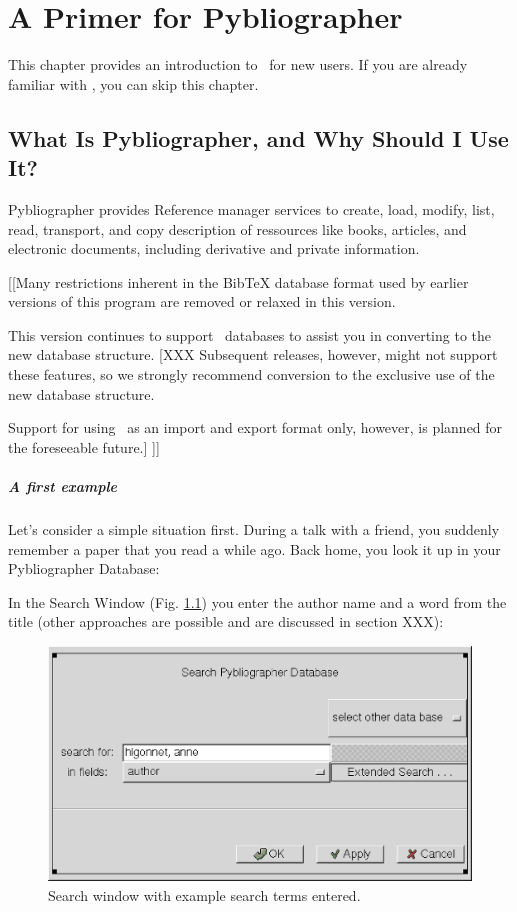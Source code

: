 
\chapter[Introduction]{A Primer for Pybliographer}
\label{cha:rgintro}


This chapter provides an introduction to \Pyb\ for new users.
If you are already familiar with \Pyb, you can skip this chapter.


\section{What Is Pybliographer, and Why Should I Use It? }
\label{sec:whyuse}




Pybliographer provides Reference manager services to create, load,
modify, list, read, transport, and copy description of ressources like
books, articles, and electronic documents, including derivative and
private information.

[[Many restrictions inherent in the  BibTeX database format used by
earlier versions of this program are removed or relaxed in this
version. 

This version continues to support \BibTeX\ databases to assist you in
converting to the new database structure. [XXX Subsequent releases,
however, might not support these features, so we strongly recommend
conversion to the exclusive use of the new database structure.

Support for using \BibTeX\ as an import and export format only,
however, is planned for the foreseeable future.] 
]]



\paragraph{A first example}

\label{sec:first-example}

Let's consider a simple situation first.  During a talk with a friend,
you suddenly remember a paper that you read a while ago.  Back home,
you look it up in your Pybliographer Database:

In the Search Window (Fig. \ref{fig:searchx1}) you enter the author name and
a word from the title (other approaches are possible and are discussed
in section XXX):

\begin{figure}[htbp]
  \includegraphics[width=.6\textwidth,bb=0 0 617 342]{pics/searchx1.eps}
  \caption{Search window with example search terms entered.}
  \label{fig:searchx1}
\end{figure}


